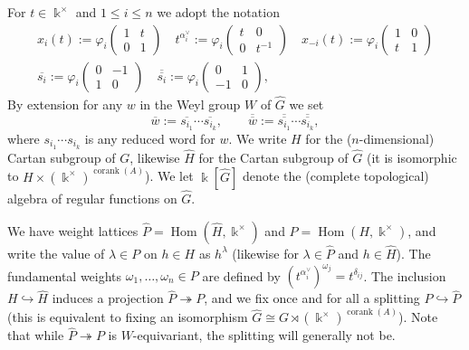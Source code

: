 \documentclass[12pt]{amsart}
\newcommand{\sayHW}[1]{\say[HW]{\color{violet}{\bf HW:}\;#1}}
\newcommand{\sayDR}[1]{\say[DR]{\color{red}{\bf DR:}\;#1}}
\newcommand{\kk}{\Bbbk}%
\newcommand\onto{\twoheadrightarrow}
\newcommand\into{\hookrightarrow}
\DeclareMathOperator{\Hom}{Hom}
\DeclareMathOperator{\corank}{corank}
\newcommand{\ol}[1]{\overline{#1}}
\newcommand{\dol}[1]{\overline{\overline{#1}}}
\theoremstyle{remark}
\numberwithin{equation}{section}
\begin{document}
For $t \in \kk^\times$ and $1 \leq i \leq n$ we adopt the notation 
\begin{gather}
x_{i}(t):=\varphi_i\begin{pmatrix} 1 & t \\ 0 & 1\end{pmatrix} \quad  
t^{\alpha_i^\vee}:=\varphi_i\begin{pmatrix}t & 0 \\ 0 & t^{-1}\end{pmatrix} \quad
x_{-i}(t):=\varphi_i\begin{pmatrix} 1 & 0 \\ t & 1\end{pmatrix} \\
\ol{s_{i}} := \varphi_i \begin{pmatrix} 0 & -1 \\ 1 & 0 \end{pmatrix} \quad
\dol{s_{i}} := \varphi_i \begin{pmatrix} 0 & 1 \\ -1 & 0 \end{pmatrix},
\end{gather}%
By extension for any $w$ in the Weyl group $W$ of $\widehat{G}$ we set \[\ol{w} := \ol{s_{i_1}}\cdots\ol{s_{i_k}}, \quad \quad \dol{w} := \dol{s_{i_1}}\cdots\dol{s_{i_k}},\] where $s_{i_1}\cdots s_{i_k}$ is any reduced word for $w$. 
We write $H$ for the ($n$-dimensional) Cartan subgroup of $G$, likewise $\widehat{H}$ for the Cartan subgroup of $\widehat{G}$ (it is isomorphic to $H \times (\kk^\times)^{\corank(A)}$). We let $\kk[\widehat{G}]$ denote the (complete topological) algebra of regular functions on $\widehat{G}$.

We have weight lattices $\widehat{P} = \Hom(\widehat{H},\kk^\times)$ and $P = \Hom(H,\kk^\times)$, and write the value of $\lambda \in P$ on $h \in H$ as $h^\lambda$ (likewise for $\lambda \in \widehat{P}$ and $h \in \widehat{H}$). The fundamental weights $\omega_1,\dotsc,\omega_n \in P$ are defined by $(t^{\alpha_i^\vee})^{\omega_j} = t^{\delta_{ij}}$. The inclusion $H \into \widehat{H}$ induces a projection $\widehat{P} \onto P$, and we fix once and for all a splitting $P \into \widehat{P}$ (this is equivalent to fixing an isomorphism $\widehat{G} \cong G \rtimes (\kk^\times)^{\corank(A)}$). Note that while $\widehat{P} \onto P$ is $W$-equivariant, the splitting will generally not be.
\end{document}

